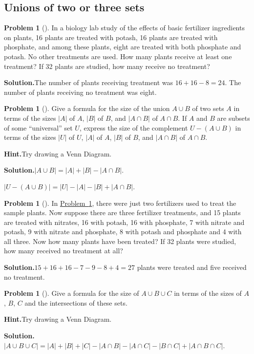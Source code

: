 \documentclass[10pt,]{book}
\theoremstyle{plain}
\theoremstyle{definition}
\newtheorem{activity}[project]{Problem}
\theoremstyle{definition}
\numberwithin{equation}{chapter}
\begin{document}
\subsection[{Unions of two or three sets}]{Unions of two or three sets}\label{subsection-43}
\begin{activity}[]\label{fertilizer2}
In a biology lab study of the effects of basic fertilizer ingredients on plants, 16 plants are treated with potash, 16 plants are treated with phosphate, and among these plants, eight are treated with both phosphate and potash. No other treatments are used. How many plants receive at least one treatment? If 32 plants are studied, how many receive no treatment?%
\par\medskip\noindent%
\textbf{Solution.}\quad The number of plants receiving treatment was \(16+16-8 = 24\). The number of plants receiving no treatment was eight.%
\end{activity}
\begin{activity}[]\label{twosetintersection}
Give a formula for the size of the union \(A\cup B\) of two sets \(A\) in terms of the sizes \(|A|\) of \(A\), \(|B|\) of \(B\), and \(|A\cap B|\) of \(A\cap B\). If \(A\) and \(B\) are subsets of some ``universal'' set \(U\), express the size of the complement \(U-(A\cup B)\) in terms of the sizes \(|U|\) of \(U\), \(|A|\) of \(A\), \(|B|\) of \(B\), and \(|A\cap B|\) of \(A\cap B\).%
\par\medskip\noindent%
\textbf{Hint.}\quad Try drawing a Venn Diagram.%
\par\medskip\noindent%
\textbf{Solution.}\quad \(|A\cup B|=|A| + |B| - |A\cap B|\).%
\par
\(|U-(A\cup B)| = |U|-|A|-|B| + |A
\cap B|\).%
\end{activity}
\begin{activity}[]\label{activity-227}
In \hyperref[fertilizer2]{Problem~\ref{fertilizer2}}, there were just two fertilizers used to treat the sample plants. Now suppose there are three fertilizer treatments, and 15 plants are treated with nitrates, 16 with potash, 16 with phosphate, 7 with nitrate and potash, 9 with nitrate and phosphate, 8 with potash and phosphate and 4 with all three. Now how many plants have been treated? If 32 plants were studied, how many received no treatment at all?%
\par\medskip\noindent%
\textbf{Solution.}\quad \(15+16+16-7-9-8+4=27\) plants were treated and five received no treatment.%
\end{activity}
\begin{activity}[]\label{threesetintersection}
Give a formula for the size of \(A\cup B\cup C\) in terms of the sizes of \(A\), \(B\), \(C\) and the intersections of these sets.%
\par\medskip\noindent%
\textbf{Hint.}\quad Try drawing a Venn Diagram.%
\par\medskip\noindent%
\textbf{Solution.}\quad \(|A\cup B\cup C|=|A|+|B|+|C|-|A\cap B|- |A\cap C| - |B\cap
C| +|A\cap B\cap C|\).%
\end{activity}
\typeout{************************************************}
\typeout{************************************************}
\end{document}
